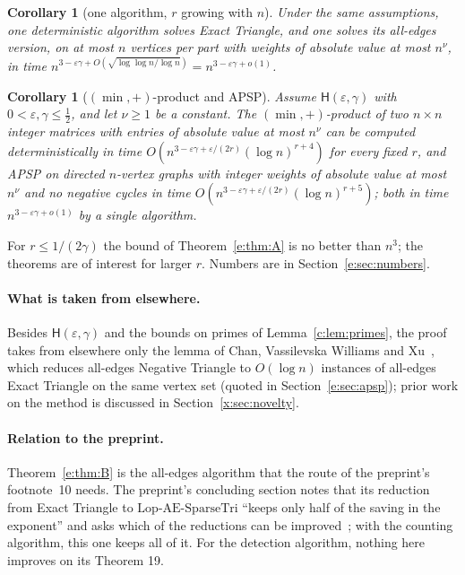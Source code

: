 \documentclass[11pt]{article}
\newtheorem{corollary}[theorem]{Corollary}
\theoremstyle{definition}
\theoremstyle{remark}
\newcommand{\Lop}{\mathrm{Lop}\text{-}\allowbreak\mathrm{AE}\text{-}\allowbreak\mathrm{SparseTri}}
\newcommand{\Hyp}{\mathsf{H}}
\begin{document}
\begin{corollary}[one algorithm, $r$ growing with $n$]\label{e:cor:uniform}
Under the same assumptions, one deterministic algorithm solves Exact Triangle, and one solves its all-edges version, on at most $n$ vertices per part with weights of absolute value at most $n^\nu$, in time $n^{3-\varepsilon\gamma+O(\sqrt{\log\log n/\log n})}=n^{3-\varepsilon\gamma+o(1)}$.
\end{corollary}

\begin{corollary}[$(\min,+)$-product and APSP]\label{e:cor:C}
Assume $\Hyp(\varepsilon,\gamma)$ with $0<\varepsilon,\gamma\le\frac12$, and let $\nu\ge1$ be a constant. The $(\min,+)$-product of two $n\times n$ integer matrices with entries of absolute value at most $n^\nu$ can be computed deterministically in time $O(n^{3-\varepsilon\gamma+\varepsilon/(2r)}(\log n)^{r+4})$ for every fixed $r$, and APSP on directed $n$-vertex graphs with integer weights of absolute value at most $n^\nu$ and no negative cycles in time $O(n^{3-\varepsilon\gamma+\varepsilon/(2r)}(\log n)^{r+5})$; both in time $n^{3-\varepsilon\gamma+o(1)}$ by a single algorithm.
\end{corollary}

For $r\le1/(2\gamma)$ the bound of Theorem~\ref{e:thm:A} is no better than $n^3$; the theorems are of interest for larger $r$. Numbers are in Section~\ref{e:sec:numbers}.

\paragraph{What is taken from elsewhere.} Besides $\Hyp(\varepsilon,\gamma)$ and the bounds on primes of Lemma~\ref{c:lem:primes}, the proof takes from elsewhere only the lemma of Chan, Vassilevska Williams and Xu~\cite[Lemma~9.2]{CVX23}, which reduces all-edges Negative Triangle to $O(\log n)$ instances of all-edges Exact Triangle on the same vertex set (quoted in Section~\ref{e:sec:apsp}); prior work on the method is discussed in Section~\ref{x:sec:novelty}.

\paragraph{Relation to the preprint.} Theorem~\ref{e:thm:B} is the all-edges algorithm that the route of the preprint's footnote~10 needs. The preprint's concluding section notes that its reduction from Exact Triangle to $\Lop$ ``keeps only half of the saving in the exponent'' and asks which of the reductions can be improved~\cite[Section~6]{ZT}; with the counting algorithm, this one keeps all of it. For the detection algorithm, nothing here improves on its Theorem 19.
\end{document}
